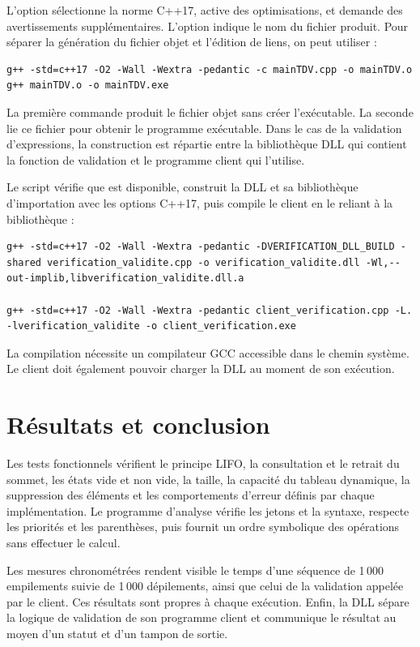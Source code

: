 \documentclass[12pt,a4paper]{article}
\newcommand{\code}[1]{\texttt{\detokenize{#1}}}
\begin{document}
 L'option \code{-std=c++17} sélectionne la norme C++17, \code{-O2} active des optimisations, et \code{-Wall -Wextra -pedantic} demande des avertissements supplémentaires. L'option \code{-o} indique le nom du fichier produit. Pour séparer la génération du fichier objet et l'édition de liens, on peut utiliser \code{-c} :

 \begin{lstlisting}[language={}]
g++ -std=c++17 -O2 -Wall -Wextra -pedantic -c mainTDV.cpp -o mainTDV.o
g++ mainTDV.o -o mainTDV.exe
 \end{lstlisting}

 La première commande produit le fichier objet sans créer l'exécutable. La seconde lie ce fichier pour obtenir le programme exécutable. Dans le cas de la validation d'expressions, la construction est répartie entre la bibliothèque DLL qui contient la fonction de validation et le programme client qui l'utilise.

 Le script \code{build\_dll.bat} vérifie que \code{g++} est disponible, construit la DLL et sa bibliothèque d'importation avec les options C++17, puis compile le client en le reliant à la bibliothèque :

\begin{lstlisting}[language={}]
g++ -std=c++17 -O2 -Wall -Wextra -pedantic -DVERIFICATION_DLL_BUILD -shared verification_validite.cpp -o verification_validite.dll -Wl,--out-implib,libverification_validite.dll.a

g++ -std=c++17 -O2 -Wall -Wextra -pedantic client_verification.cpp -L. -lverification_validite -o client_verification.exe
\end{lstlisting}

La compilation nécessite un compilateur GCC accessible dans le chemin système. Le client doit également pouvoir charger la DLL au moment de son exécution.

\section{Résultats et conclusion}

Les tests fonctionnels vérifient le principe LIFO, la consultation et le retrait du sommet, les états vide et non vide, la taille, la capacité du tableau dynamique, la suppression des éléments et les comportements d'erreur définis par chaque implémentation. Le programme d'analyse vérifie les jetons et la syntaxe, respecte les priorités et les parenthèses, puis fournit un ordre symbolique des opérations sans effectuer le calcul.

Les mesures chronométrées rendent visible le temps d'une séquence de 1\,000 empilements suivie de 1\,000 dépilements, ainsi que celui de la validation appelée par le client. Ces résultats sont propres à chaque exécution. Enfin, la DLL sépare la logique de validation de son programme client et communique le résultat au moyen d'un statut et d'un tampon de sortie.
\end{document}
